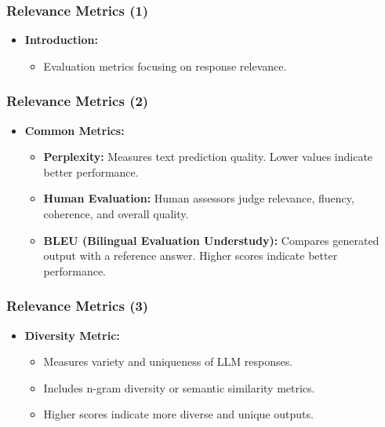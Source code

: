 \begin{frame}[fragile]\frametitle{Relevance Metrics (1)}
  \begin{itemize}
    \item \textbf{Introduction:}
      \begin{itemize}
        \item Evaluation metrics focusing on response relevance.
      \end{itemize}
  \end{itemize}
\end{frame}

\begin{frame}[fragile]\frametitle{Relevance Metrics (2)}
  \begin{itemize}
    \item \textbf{Common Metrics:}
      \begin{itemize}
        \item \textbf{Perplexity:} Measures text prediction quality. Lower values indicate better performance.
        \item \textbf{Human Evaluation:} Human assessors judge relevance, fluency, coherence, and overall quality.
        \item \textbf{BLEU (Bilingual Evaluation Understudy):} Compares generated output with a reference answer. Higher scores indicate better performance.
      \end{itemize}
  \end{itemize}
\end{frame}

\begin{frame}[fragile]\frametitle{Relevance Metrics (3)}
  \begin{itemize}
    \item \textbf{Diversity Metric:}
      \begin{itemize}
        \item Measures variety and uniqueness of LLM responses.
        \item Includes n-gram diversity or semantic similarity metrics.
        \item Higher scores indicate more diverse and unique outputs.
      \end{itemize}
  \end{itemize}
\end{frame}

